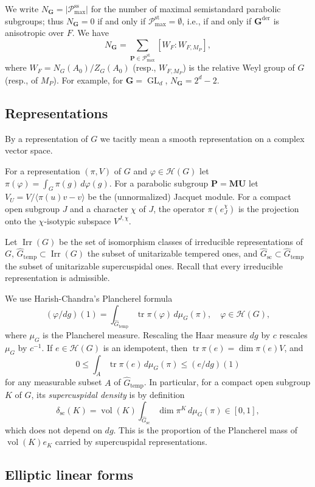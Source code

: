 \documentclass[11pt,reqno]{amsart}
\numberwithin{equation}{section}
\theoremstyle{plain}
\theoremstyle{definition}
\theoremstyle{remark}
\theoremstyle{plain}
\newcommand{\bG}{\mathbf{G}}     %
\newcommand{\bP}{\mathbf{P}}     %
\newcommand{\bM}{\mathbf{M}}     %
\newcommand{\bU}{\mathbf{U}}     %
\newcommand{\scd}[1]{\delta_{\mathrm{sc}}(#1)}
\newcommand{\Hk}{\mathcal{H}}    %
\newcommand{\Pc}{\mathscr{P}^{\mathrm{st}}_{\mathrm{max}}}    %
\newcommand{\Pcss}{\mathscr{P}^{\mathrm{ss}}_{\mathrm{max}}}  %
\newcommand{\Nss}{N_{\bG}}  %
\newcommand{\Gsc}{\widehat{G}_{\mathrm{sc}}}    %
\newcommand{\Gtemp}{\widehat{G}_{\mathrm{temp}}} %
\newcommand{\der}{\operatorname{der}}
\newcommand{\abs}[1]{\lvert#1\rvert}
\DeclareMathOperator{\vol}{vol}
\DeclareMathOperator{\tr}{tr}
\DeclareMathOperator{\GL}{GL}
\DeclareMathOperator{\Irr}{Irr}
\begin{document}
We write $\Nss=\abs{\Pcss}$ for the number of maximal semistandard parabolic
subgroups; thus $\Nss=0$ if and only if $\Pc=\emptyset$, i.e., if and only if
$\bG^{\der}$ is anisotropic over $F$. We have
\[
\Nss=\sum_{\bP\in\Pc}[W_F:W_{F,M_P}],
\]
where $W_F=N_G(A_0)/Z_G(A_0)$ (resp., $W_{F,M_P}$) is the relative Weyl group of
$G$ (resp., of $M_P$). For example, for $\bG=\GL_d$, $\Nss=2^d-2$.


\subsection{Representations}\label{sec:representations}
By a representation of $G$ we tacitly mean a smooth representation on a complex vector space.

For a representation $(\pi,V)$ of $G$ and $\varphi\in\Hk(G)$ let $\pi(\varphi)=\int_G\pi(g)\,d\varphi(g)$.
For a parabolic subgroup $\bP=\bM\bU$ let $V_U=V/\langle\pi(u)v-v\rangle$ be the (unnormalized) Jacquet module.
For a compact open subgroup $J$ and a character $\chi$ of $J$, the operator $\pi(e_J^\chi)$ is the projection onto the
$\chi$-isotypic subspace $V^{J,\chi}$.

Let $\Irr(G)$ be the set of isomorphism classes of
irreducible representations of $G$, $\Gtemp\subset\Irr(G)$
the subset of unitarizable tempered ones, and $\Gsc\subset\Gtemp$ the subset of unitarizable supercuspidal ones.
Recall that every irreducible representation is admissible.

We use Harish-Chandra's Plancherel formula 
\begin{equation}\label{eq:plancherel}
(\varphi/dg)(1)=\int_{\Gtemp}\tr\pi(\varphi)\,d\mu_G(\pi),\quad\varphi\in\Hk(G),
\end{equation}
where $\mu_G$ is the Plancherel measure.
Rescaling the Haar measure $dg$ by $c$ rescales $\mu_G$ by $c^{-1}$.
If $e\in\Hk(G)$ is an idempotent, then $\tr\pi(e)=\dim\pi(e)V$, and
\[
0\le \int_A\tr\pi(e)\,d\mu_G(\pi)\le(e/dg)(1)
\]
for any measurable subset $A$ of $\Gtemp$.
In particular, for a compact open subgroup $K$ of $G$, its \emph{supercuspidal density} is by definition
\[
\scd{K}=\vol(K)\int_{\Gsc}\dim\pi^K\,d\mu_G(\pi)\in[0,1],
\]
which does not depend on $dg$. This is the proportion of the Plancherel mass of $\vol(K)e_K$ carried by
supercuspidal representations.


\subsection{Elliptic linear forms}\label{sec:ellipticforms}
\end{document}
